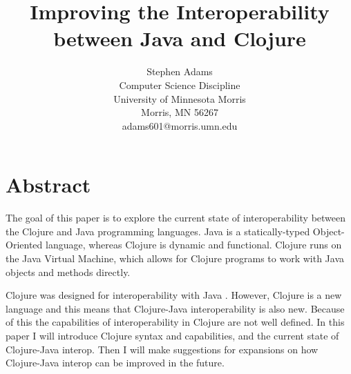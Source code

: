 \documentclass[12pt]{article}
\begin{document}
\pagestyle{plain}
%

\title{Improving the Interoperability between Java and Clojure}
%
%

\author{
Stephen Adams \\
Computer Science Discipline \\
University of Minnesota Morris\\
Morris, MN 56267\\
adams601@morris.umn.edu
}

\date{}

\maketitle
\thispagestyle{empty}

\section*{\centering Abstract}

	The goal of this paper is to explore the current state of interoperability between the Clojure and Java programming languages. Java is a statically-typed Object-Oriented language, whereas Clojure is dynamic and functional. Clojure runs on the Java Virtual Machine, which allows for Clojure programs to work with Java objects and methods directly. 
	
	Clojure was designed for interoperability with Java \cite{cloj:rationale}. However, Clojure is a new language and this means that Clojure-Java interoperability is also new. Because of this the capabilities of interoperability in Clojure are not well defined. In this paper I will introduce Clojure syntax and capabilities, and the current state of Clojure-Java interop. Then I will make suggestions for expansions on how Clojure-Java interop can be improved in the future.
\end{document}
